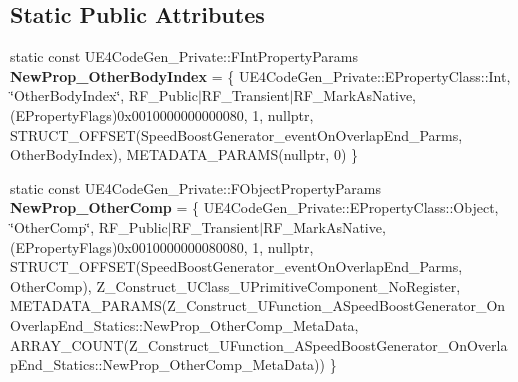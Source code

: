 \subsection*{Static Public Attributes}
\begin{DoxyCompactItemize}
\item 
\mbox{\label{struct_z___construct___u_function___a_speed_boost_generator___on_overlap_end___statics_a3c60164c6195ca03064db5d2bee194cb}} 
static const U\+E4\+Code\+Gen\+\_\+\+Private\+::\+F\+Int\+Property\+Params {\bfseries New\+Prop\+\_\+\+Other\+Body\+Index} = \{ U\+E4\+Code\+Gen\+\_\+\+Private\+::\+E\+Property\+Class\+::\+Int, \char`\"{}Other\+Body\+Index\char`\"{}, R\+F\+\_\+\+Public$\vert$R\+F\+\_\+\+Transient$\vert$R\+F\+\_\+\+Mark\+As\+Native, (E\+Property\+Flags)0x0010000000000080, 1, nullptr, S\+T\+R\+U\+C\+T\+\_\+\+O\+F\+F\+S\+E\+T(\+Speed\+Boost\+Generator\+\_\+event\+On\+Overlap\+End\+\_\+\+Parms, Other\+Body\+Index), M\+E\+T\+A\+D\+A\+T\+A\+\_\+\+P\+A\+R\+A\+M\+S(nullptr, 0) \}
\item 
\mbox{\label{struct_z___construct___u_function___a_speed_boost_generator___on_overlap_end___statics_ad97f9780b18943957a5b6b52724e2c5e}} 
static const U\+E4\+Code\+Gen\+\_\+\+Private\+::\+F\+Object\+Property\+Params {\bfseries New\+Prop\+\_\+\+Other\+Comp} = \{ U\+E4\+Code\+Gen\+\_\+\+Private\+::\+E\+Property\+Class\+::\+Object, \char`\"{}Other\+Comp\char`\"{}, R\+F\+\_\+\+Public$\vert$R\+F\+\_\+\+Transient$\vert$R\+F\+\_\+\+Mark\+As\+Native, (E\+Property\+Flags)0x0010000000080080, 1, nullptr, S\+T\+R\+U\+C\+T\+\_\+\+O\+F\+F\+S\+E\+T(\+Speed\+Boost\+Generator\+\_\+event\+On\+Overlap\+End\+\_\+\+Parms, Other\+Comp), Z\+\_\+\+Construct\+\_\+\+U\+Class\+\_\+\+U\+Primitive\+Component\+\_\+\+No\+Register, M\+E\+T\+A\+D\+A\+T\+A\+\_\+\+P\+A\+R\+A\+M\+S(\+Z\+\_\+\+Construct\+\_\+\+U\+Function\+\_\+\+A\+Speed\+Boost\+Generator\+\_\+\+On\+Overlap\+End\+\_\+\+Statics\+::\+New\+Prop\+\_\+\+Other\+Comp\+\_\+\+Meta\+Data, A\+R\+R\+A\+Y\+\_\+\+C\+O\+U\+N\+T(\+Z\+\_\+\+Construct\+\_\+\+U\+Function\+\_\+\+A\+Speed\+Boost\+Generator\+\_\+\+On\+Overlap\+End\+\_\+\+Statics\+::\+New\+Prop\+\_\+\+Other\+Comp\+\_\+\+Meta\+Data)) \}
\item 
\mbox{\label{struct_z___construct___u_function___a_speed_boost_generator___on_overlap_end___statics_aee5e753668eeb4d4063642665b5b683f}} 

\end{DoxyCompactItemize}
